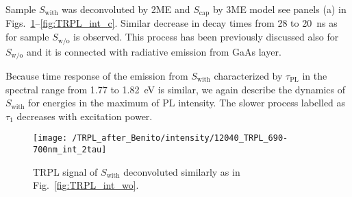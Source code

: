 


Sample $S_\mathrm{with}$ was deconvoluted by 2ME and $S_\mathrm{cap}$ by 3ME model see panels (a) in Figs.~\ref{fig:TRPL_int_w}--\ref{fig:TRPL_int_c}. Similar decrease in decay times from 28 to 20~ns as for sample $S_\mathrm{w/o}$ is observed. This process has been previously discussed also for $S_\mathrm{w/o}$ and it is connected with radiative emission from GaAs layer.
%

Because time response of the emission from $S_\mathrm{with}$ characterized by $\tau_\mathrm{PL}$ in the spectral range from 1.77 to 1.82~eV is similar, we again describe the dynamics of $S_\mathrm{with}$ for energies in the maximum of PL intensity. The slower process labelled as $\tau_1$ decreases with excitation power. 
%
{\color{red}{(TADY se musime domluvit, co to teda ma byt. Navrhy PS: 1) ovlivnena ta GaAs vrstva - na tomto vzorku by vubec nebyly tecky a jen pri snaze je narust, by se rozsirila tloustka te GaAs vrstvy a prineslo by to do ni trosku india. Coz by posunulo PL k nizsim energiim? a mohlo by to protahnout rakombinacni cas.

2) InGaAs QD typu II s dlouhou dobou zivota, ktera se ale ovlivnuje s excitaci a tim se zrychluje. ) }}
{\color{green}{(Vypoctum pro maly obsah Sb a In vyhovovala spis varianta 1.) ale jeste se to musi proverit a prepocitat.) }}
%
\begin{figure}
	\centering
	\texttt{[image: /TRPL\_after\_Benito/intensity/12040\_TRPL\_690-700nm\_int\_2tau]} %
	\caption{TRPL signal of $S_\mathrm{with}$ deconvoluted similarly as in Fig.~\ref{fig:TRPL_int_wo}.}
	\label{fig:TRPL_int_w}
\end{figure}



